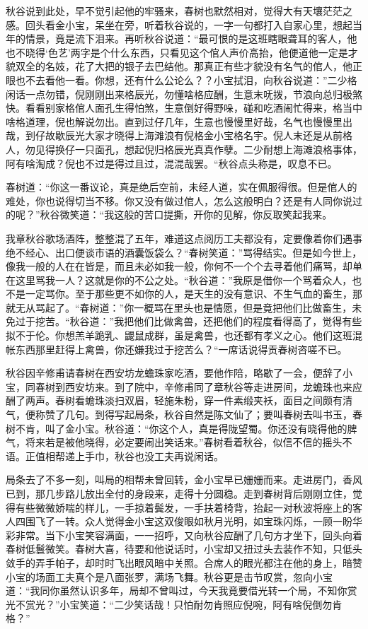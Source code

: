 \documentclass[12pt,UTF8]{ctexbook}
\begin{document}
{{{秋谷说到此处，早不觉引起他的牢骚来，春树也默然相对，觉得大有天壤茫茫之感。回头看金小宝，呆坐在旁，听着秋谷说的，一字一句都打入自家心里，想起当年的情景，竟是流下泪来。再听秋谷说道：“最可恨的是这班瞎眼聋耳的客人，他也不晓得‘色艺’两字是个什么东西，只看见这个倌人声价高抬，他便道他一定是才貌双全的名妓，花了大把的银子去巴结他。那真正有些才貌没有名气的倌人，他正眼也不去看他一看。你想，还有什么公论么？？小宝拭泪，向秋谷说道：”二少格闲话一点勿错，倪刚刚出来格辰光，勿懂啥格应酬，生意末呒拨，节浪向总归极煞快。看看别家格倌人面孔生得怕煞，生意倒好得野哚，碰和吃酒闹忙得来，格当中啥格道理，倪也解说勿出。直到过仔几年，生意也慢慢里好哉，名气也慢慢里出哉，到仔故歇辰光大家才晓得上海滩浪有倪格金小宝格名宇。倪人末还是从前格人，勿见得换仔一只面孔，想起倪归格辰光真真作孽。二少耐想上海滩浪格事体，阿有啥淘成？倪也不过是得过且过，混混哉罢。“秋谷点头称是，叹息不已。

春树道：“你这一番议论，真是绝后空前，未经人道，实在佩服得很。但是倌人的难处，你也说得切当不移。你又没有做过倌人，怎么这般明白？还是有人同你说过的呢？”秋谷微笑道：“我这般的苦口提撕，开你的见解，你反取笑起我来。

我章秋谷歌场酒阵，整整混了五年，难道这点阅历工夫都没有，定要像着你们遇事绝不经心、出口便谈市语的酒囊饭袋么？“春树笑道：”骂得结实。但是如今世上，像我一般的人在在皆是，而且未必如我一般，你何不一个个去寻着他们痛骂，却单在这里骂我一人？这就是你的不公之处。“秋谷道：”我原是借你一个骂着众人，也不是一定骂你。至于那些更不如你的人，是天生的没有意识、不生气血的畜生，那就无从骂起了。“春树道：”你一概骂在里头也是情愿，但是竟把他们比做畜生，未免过于挖苦。“秋谷道：”我把他们比做禽兽，还把他们的程度看得高了，觉得有些拟不于伦。你想羔羊跪乳、鼹鼠成群，虽是禽兽，也还都有孝义之心。他们这班混帐东西那里赶得上禽兽，你还嫌我过于挖苦么？“一席话说得贡春树咨嗟不已。

秋谷因辛修甫请春树在西安坊龙蟾珠家吃酒，要他作陪，略歇了一会，便辞了小宝，同春树到西安坊来。到了院中，辛修甫同了章秋谷等走进房间，龙蟾珠也来应酬了两声。春树看蟾珠淡扫双眉，轻施朱粉，穿一件素缎夹袄，面目之间颇有清气，便称赞了几句。到得写起局条，秋谷自然是陈文仙了；要叫春树去叫书玉，春树不肯，叫了金小宝。秋谷道：“你这个人，真是得陇望蜀。你还没有晓得他的脾气，将来若是被他晓得，必定要闹出笑话来。”春树看着秋谷，似信不信的摇头不语。正值相帮递上手巾，秋谷也没工夫再说闲话。

局条去了不多一刻，叫局的相帮未曾回转，金小宝早已姗姗而来。走进房门，香风已到，那几步路儿放出全付的身段来，走得十分圆稳。走到春树背后刚刚立住，觉得有些微微娇喘的样儿，一手掠着鬓发，一手扶着椅背，抬起一对秋波将座上的客人四围飞了一转。众人觉得金小宝这双俊眼如秋月光明，如宝珠闪烁，一顾一盼华彩非常。当下小宝笑容满面，一一招呼，又向秋谷应酬了几句方才坐下，回头向着春树低鬟微笑。春树大喜，待要和他说话时，小宝却又扭过头去装作不知，只低头敛手的弄手帕子，却时时飞出眼风暗中关照。合席人的眼光都注在他的身上，暗赞小宝的场面工夫真个是八面张罗，满场飞舞。秋谷更是击节叹赏，忽向小宝道：“我同你虽然认识多年，局却不曾叫过，今天我竟要借光转一个局，不知你赏光不赏光？”小宝笑道：“二少笑话哉！只怕耐勿肯照应倪啘，阿有啥倪倒勿肯格？”

}}}
\end{document}
